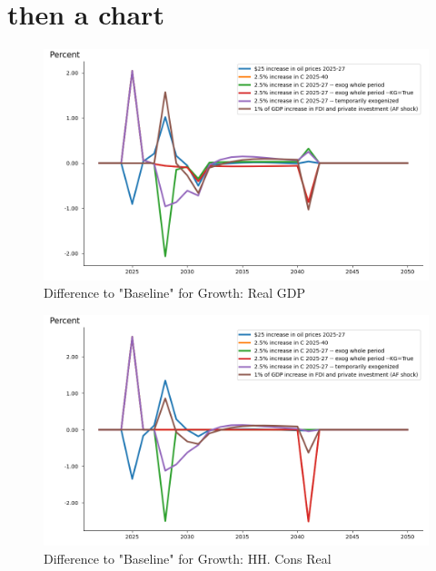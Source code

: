 \documentclass{article}
\begin{document}
\section{then a chart}
 
\begin{figure}[htbp]
\centering
\includegraphics[width=\textwidth]{"../A_plot/Real GDP, growth dif.png"}
\caption{Difference to "Baseline" for Growth: Real GDP}
\end{figure} 
 
\begin{figure}[htbp]
\centering
\includegraphics[width=\textwidth]{"../A_plot/HH. Cons Real, growth dif.png"}
\caption{Difference to "Baseline" for Growth: HH. Cons Real}
\end{figure} 
\end{document}

